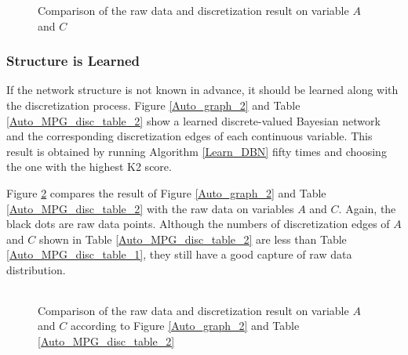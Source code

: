 \begin{figure}[ht]
    \begin{tabular}{cc}
      
    \end{tabular}
  \caption{Comparison of the raw data and discretization result on variable $A$ and $C$}
  \label{auto_exp1_distr_1_3}
\end{figure}

\subsubsection{Structure is Learned}

If the network structure is not known in advance, it should be learned along with the discretization process. Figure \ref{Auto_graph_2} and Table \ref{Auto_MPG_disc_table_2} show a learned discrete-valued Bayesian network and the corresponding discretization edges of each continuous variable. This result is obtained by running Algorithm \ref{Learn_DBN} fifty times and choosing the one with the highest K2 score.
\newline

 {\centering
\begin{minipage}{0.50\textwidth}
  \centering
  \scalebox{0.7}{
  }
  \label{Auto_graph_2}
\end{minipage}
\begin{minipage}{0.50\textwidth}
  \raggedleft
  
  \label{Auto_MPG_disc_table_2}
\end{minipage}
}

Figure \ref{auto_exp2_distr_1_3} compares the result of Figure \ref{Auto_graph_2} and Table \ref{Auto_MPG_disc_table_2} with the raw data on variables $A$ and $C$. Again, the black dots are raw data points. Although the numbers of discretization edges of $A$ and $C$ shown in Table \ref{Auto_MPG_disc_table_2} are less than Table \ref{Auto_MPG_disc_table_1}, they still have a good capture of raw data distribution.

\begin{figure}[ht]
    \begin{tabular}{cc}
      
    \end{tabular}
  \caption{Comparison of the raw data and discretization result on variable $A$ and $C$ according to Figure \ref{Auto_graph_2} and Table \ref{Auto_MPG_disc_table_2}}
  \label{auto_exp2_distr_1_3}
\end{figure}


